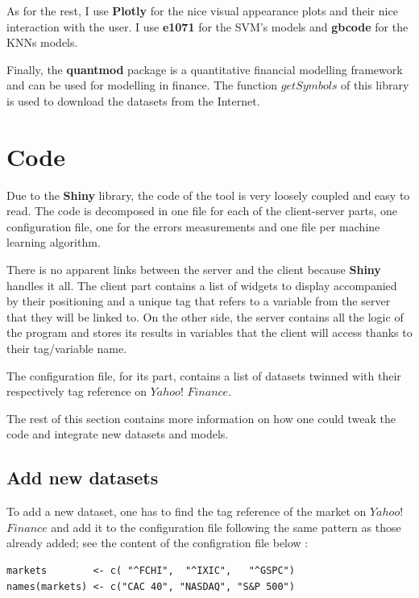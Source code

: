 \documentclass[11pt,a4paper,oneside]{book}
\begin{document}
As for the rest, I use \textbf{Plotly} \cite{plotly} for the nice visual appearance plots and their nice interaction with the user. I use \textbf{e1071} \cite{e1071} for the SVM's models and \textbf{gbcode} \cite{gbcode} for the KNNs models.

Finally, the \textbf{quantmod} \cite{quantmod} package is a quantitative financial modelling framework and can be used for modelling in finance. The function $getSymbols$ of this library is used to download the datasets from the Internet.


\section{Code}

Due to the \textbf{Shiny} library, the code of the tool is very loosely coupled and easy to read. The code is decomposed in one file for each of the client-server parts, one configuration file, one for the errors measurements and one file per machine learning algorithm. 

There is no apparent links between the server and the client because \textbf{Shiny} handles it all. The client part contains a list of widgets to display accompanied by their positioning and a unique tag that refers to a variable from the server that they will be linked to. On the other side, the server contains all the logic of the program and stores its results in variables that the client will access thanks to their tag/variable name.

The configuration file, for its part, contains a list of datasets twinned with their respectively tag reference on $Yahoo!$ $Finance$. 

The rest of this section contains more information on how one could tweak the code and integrate new datasets and models.


\subsection{Add new datasets}

To add a new dataset, one has to find the tag reference of the market on $Yahoo!$ $Finance$ and add it to the configuration file following the same pattern as those already added; see the content of the configration file below : 


\begin{lstlisting}
markets        <- c( "^FCHI",  "^IXIC",   "^GSPC")
names(markets) <- c("CAC 40", "NASDAQ", "S&P 500")
\end{lstlisting}
\end{document}
